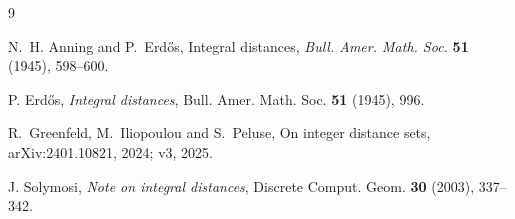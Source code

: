 \documentclass[11pt]{article}
\begin{document}
\begin{thebibliography}{9}

N.~H. Anning and P.~Erd\H{o}s,
\newblock Integral distances,
\newblock \emph{Bull. Amer. Math. Soc.} \textbf{51} (1945), 598--600.

P. Erd\H{o}s,
\emph{Integral distances},
Bull. Amer. Math. Soc. \textbf{51} (1945), 996.

R.~Greenfeld, M.~Iliopoulou and S.~Peluse,
\newblock On integer distance sets,
\newblock arXiv:2401.10821, 2024; v3, 2025.

J. Solymosi,
\emph{Note on integral distances},
Discrete Comput. Geom. \textbf{30} (2003), 337--342.

\end{thebibliography}
\end{document}
